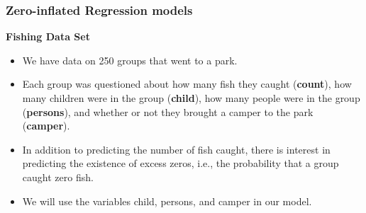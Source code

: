 \documentclass[MASTER.tex]{subfiles}
\begin{document}
\begin{frame}[fragile]
	\frametitle{Zero-inflated Regression models}
	\textbf{Fishing Data Set}
	\begin{itemize}
		\item We have data on 250 groups that went to a park. 
		\item Each group was questioned about how many fish they caught (\textbf{count}), how many children were in the group (\textbf{child}), how many people were in the group (\textbf{persons}), and whether or not they brought a camper to the park (\textbf{camper}).
		\item 
		In addition to predicting the number of fish caught, there is interest in predicting the existence of excess zeros, i.e., the probability that a group caught zero fish. 
		\item We will use the variables child, persons, and camper in our model. 
	\end{itemize}
\end{frame}
\end{document}
